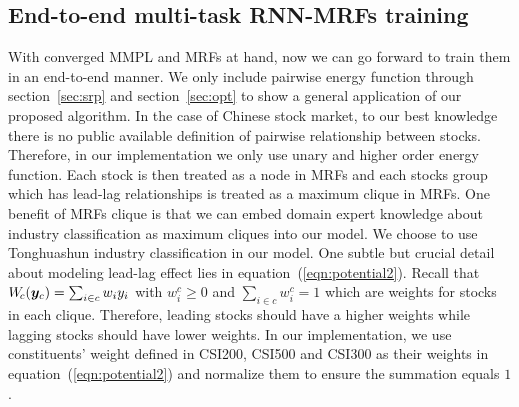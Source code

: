 \subsection{End-to-end multi-task RNN-MRFs training}
\label{sec:mrf_train}

With converged MMPL and MRFs at hand, now we can go forward to
train them in an end-to-end manner. We only include pairwise
energy function through section~\ref{sec:srp} and
section~\ref{sec:opt} to show a general application of our
proposed algorithm. In the case of Chinese stock market, to our
best knowledge there is no public available definition of
pairwise relationship between stocks. Therefore, in our
implementation we only use unary and higher order energy
function. Each stock is then treated as a node in MRFs and each
stocks group which has lead-lag relationships is treated as a
maximum clique in MRFs. One benefit of MRFs clique is that we can
embed domain expert knowledge about industry classification as
maximum cliques into our model. We choose to use Tonghuashun
industry classification \cite{ths} in our model. One subtle but
crucial detail about modeling lead-lag effect lies in
equation~(\ref{eqn:potential2}). Recall that $W_{\!c}({\bm{y}}_c) =
\sum_{i \in c} w_i y_i$ with $w^c_i \geq 0$ and $\sum_{i \in c}
w^c_i = 1$ which are weights for stocks in each clique.
Therefore, leading stocks should have a higher weights while
lagging stocks should have lower weights. In our implementation,
we use constituents' weight defined in CSI200, CSI500 and CSI300
as their weights in equation~(\ref{eqn:potential2}) and normalize
them to ensure the summation equals $1$.



